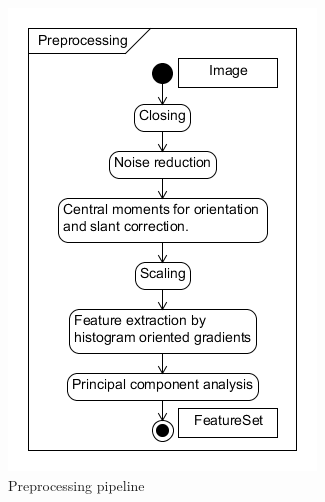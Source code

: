 \documentclass[%
        compressed,
        final,
        notitlepage,
        narroweqnarray,
        inline,
        twoside,
        ]{ieee}
\begin{document}
\begin{figure}[h!]
    \centering
    \includegraphics[width=\columnwidth]{preprocessing2.png}
    \caption{Preprocessing pipeline}
    \label{fig:preprocessing}
\end{figure}
\end{document}
